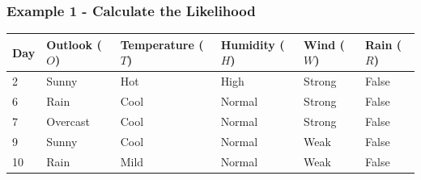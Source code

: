 \documentclass[aspectratio=169, 10pt]{beamer}
\begin{document}
\begin{frame}[t]
    \frametitle{Example 1 - Calculate the Likelihood}
    \begin{table}[]
        \small
        \begin{tabular}{l|llll|l}
        \textbf{Day} & \textbf{Outlook} ($O$) & \textbf{Temperature} ($T$) & \textbf{Humidity} ($H$) & \textbf{Wind} ($W$) & \textbf{Rain} ($R$) \\ \hline
        2            & Sunny            & Hot                  & High              & Strong        & False            \\
        6            & Rain             & Cool                 & Normal            & Strong        & False            \\
        7            & Overcast         & Cool                 & Normal            & Strong        & False            \\
        9            & Sunny            & Cool                 & Normal            & Weak          & False            \\
        10           & Rain             & Mild                 & Normal            & Weak          & False            \\
        \end{tabular}
    \end{table}


\end{frame}
\end{document}

